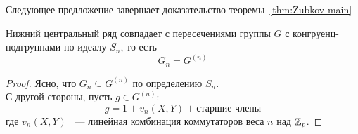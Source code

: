 Следующее предложение завершает доказательство теоремы~\ref{thm:Zubkov-main}
\begin{proposition}
    Нижний центральный ряд совпадает с пересечениями группы $G$ с конгруенц-подгруппами по идеалу $S_n$, то есть
    \[
        G_n = G^{(n)}
    \]
\end{proposition}
\begin{proof}
    Ясно, что $G_n \subseteq G^{(n)}$ по определению $S_n$.\\
    С другой стороны, пусть $g\in G^{(n)}$:
    \[
        g = 1 + v_n(X, Y) + \text{старшие члены}
    \]
    где $v_n(X,Y)$ ~--- линейная комбинация коммутаторов веса $n$ над $\mathbb{Z}_p$.

\end{proof}
